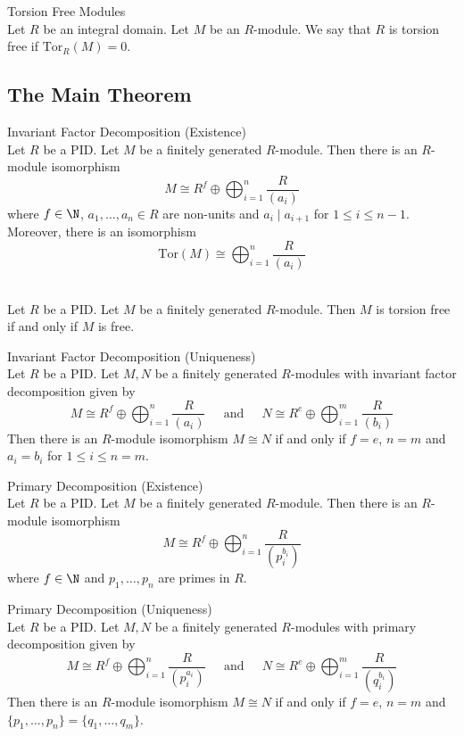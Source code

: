 \documentclass[a4paper]{article}
\begin{document}
\begin{defn}{Torsion Free Modules}{}\\
Let $R$ be an integral domain. Let $M$ be an $R$-module. We say that $R$ is torsion free if $\text{Tor}_R(M)=0$. 
\end{defn}

\subsection{The Main Theorem}
\begin{thm}{Invariant Factor Decomposition (Existence)}{}\\
Let $R$ be a PID. Let $M$ be a finitely generated $R$-module. Then there is an $R$-module isomorphism $$M\cong R^f\oplus\bigoplus_{i=1}^n\frac{R}{(a_i)}$$ where $f\in\N$, $a_1,\dots,a_n\in R$ are non-units and $a_i\;|\;a_{i+1}$ for $1\leq i\leq n-1$. Moreover, there is an isomorphism $$\text{Tor}(M)\cong\bigoplus_{i=1}^n\frac{R}{(a_i)}$$
\end{thm}

\begin{crl}{}{}\\
Let $R$ be a PID. Let $M$ be a finitely generated $R$-module. Then $M$ is torsion free if and only if $M$ is free. 
\end{crl}

\begin{thm}{Invariant Factor Decomposition (Uniqueness)}{}\\
Let $R$ be a PID. Let $M,N$ be a finitely generated $R$-modules with invariant factor decomposition given by $$M\cong R^f\oplus\bigoplus_{i=1}^n\frac{R}{(a_i)}\;\;\;\;\text{ and }\;\;\;\;N\cong R^e\oplus\bigoplus_{i=1}^m\frac{R}{(b_i)}$$ Then there is an $R$-module isomorphism $M\cong N$ if and only if $f=e$, $n=m$ and $a_i=b_i$ for $1\leq i\leq n=m$. 
\end{thm}

\begin{thm}{Primary Decomposition (Existence)}{}\\
Let $R$ be a PID. Let $M$ be a finitely generated $R$-module. Then there is an $R$-module isomorphism $$M\cong R^f\oplus\bigoplus_{i=1}^n\frac{R}{(p_i^{b_i})}$$ where $f\in\N$ and $p_1,\dots,p_n$ are primes in $R$. 
\end{thm}

\begin{thm}{Primary Decomposition (Uniqueness)}{}\\
Let $R$ be a PID. Let $M,N$ be a finitely generated $R$-modules with primary decomposition given by $$M\cong R^f\oplus\bigoplus_{i=1}^n\frac{R}{(p_i^{a_i})}\;\;\;\;\text{ and }\;\;\;\;N\cong R^e\oplus\bigoplus_{i=1}^m\frac{R}{(q_i^{b_i})}$$ Then there is an $R$-module isomorphism $M\cong N$ if and only if $f=e$, $n=m$ and $\{p_1,\dots,p_n\}=\{q_1,\dots,q_m\}$. 
\end{thm}
\end{document}
